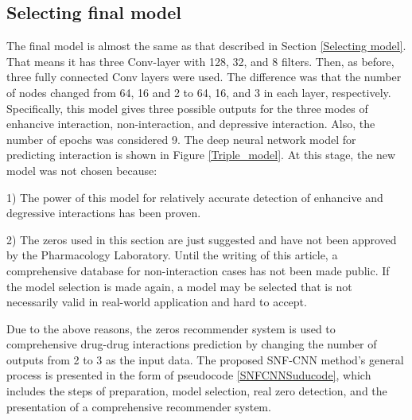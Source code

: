 \documentclass{bmcart}
\begin{document}
\subsection*{Selecting final model}
The final model is almost the same as that described in Section
\ref{Selecting model}. That means it has three Conv-layer with 128, 32, and 8 filters. Then, as before, three fully connected Conv layers were used. The difference was that the number of nodes changed from 64, 16 and 2 to 64, 16, and 3 in each layer, respectively. Specifically, this model gives three possible outputs for the three modes of enhancive interaction, non-interaction, and depressive interaction. Also, the number of epochs was considered 9. The deep neural network model for predicting interaction is shown in Figure
\ref{Triple_model}. At this stage, the new model was not chosen because:

1) The power of this model for relatively accurate detection of enhancive and degressive interactions has been proven.

2) The zeros used in this section are just suggested and have not been approved by the Pharmacology Laboratory. Until the writing of this article, a comprehensive database for non-interaction cases has not been made public. If the model selection is made again, a model may be selected that is not necessarily valid in real-world application and hard to accept.

Due to the above reasons, the zeros recommender system is used to comprehensive drug-drug interactions prediction by changing the number of outputs from 2 to 3 as the input data. The proposed SNF-CNN method's general process is presented in the form of pseudocode \ref{SNFCNNSuducode}, which includes the steps of preparation, model selection, real zero detection, and the presentation of a comprehensive recommender system.
\end{document}
